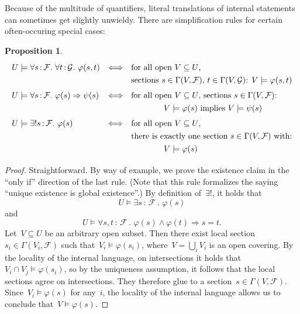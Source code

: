 \documentclass[10pt]{amsart}
\theoremstyle{definition}
\theoremstyle{plain}
\newtheorem{prop}[defn]{Proposition}
\theoremstyle{remark}
\newcommand{\F}{\mathcal{F}}
\newcommand{\G}{\mathcal{G}}
\newcommand{\?}{\,{:}\,}
\renewcommand{\_}{\mathpunct{.}\,}
\begin{document}

Because of the multitude of quantifiers, literal translations of internal statements
can sometimes get slightly unwieldy. There are simplification rules for certain
often-occuring special cases:
\begin{prop}\label{prop:simplification}
    \[ \renewcommand{\arraystretch}{1.3}\begin{array}{@{}lcl@{}}
      U \models \forall s\?\F\_ \forall t\?\G\_ \varphi(s,t)
      &\Longleftrightarrow&
      \text{for all open~$V \subseteq U$,} \\
      && \text{sections~$s \in \Gamma(V,\F)$, $t \in \Gamma(V,\G)$:
      $V \models \varphi(s,t)$} \\[0.3em]
      U \models \forall s\?\F\_ \varphi(s) \Rightarrow \psi(s)
      &\Longleftrightarrow&
      \text{for all open~$V \subseteq U$, sections~$s \in \Gamma(V,\F)$:} \\
      &&\qquad\qquad \text{$V \models \varphi(s)$ implies $V \models \psi(s)$}
      \\[0.3em]
      U \models \exists!s\?\F\_ \varphi(s)
      &\Longleftrightarrow&
      \text{for all open~$V \subseteq U$,} \\
      &&
      \text{there is exactly one section~$s \in \Gamma(V,\F)$ with:} \\
      &&\qquad\qquad V \models \varphi(s)
    \end{array} \]
\end{prop}
\begin{proof}Straightforward. By way of example, we prove the existence claim
in the ``only if'' direction of the last rule. (Note that this rule formalizes
the saying ``unique existence is global existence''.) By definition of~$\exists!$, it
holds that
\[ U \models \exists s\?\F\_ \varphi(s) \]
and
\[ U \models \forall s,t\?\F\_ \varphi(s) \wedge \varphi(t) \Rightarrow s = t.  \]
Let~$V \subseteq U$ be an arbitrary open subset. Then there exist local
section~$s_i \in \Gamma(V_i,\F)$ such that~$V_i \models \varphi(s_i)$, where~$V
= \bigcup_i V_i$ is an open covering. By the locality of the internal language,
on intersections it holds that~$V_i \cap V_j \models \varphi(s_i)$, so by the
uniqueness assumption, it follows that the local sections agree on intersections.
They therefore glue to a section~$s \in \Gamma(V,\F)$. Since~$V_i \models
\varphi(s)$ for any~$i$, the locality of the internal language allows us to
conclude that~$V \models \varphi(s)$.
\end{proof}
\end{document}
